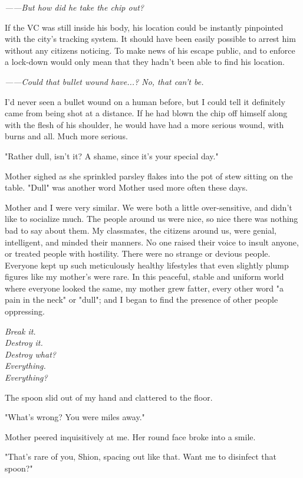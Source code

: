 \emph{------But how did he take the chip out?}

If the VC was still inside his body, his location could be instantly
pinpointed with the city's tracking system. It should have been easily
possible to arrest him without any citizens noticing. To make news of
his escape public, and to enforce a lock-down would only mean that they
hadn't been able to find his location.

\emph{------Could that bullet wound have...? No, that can't be.}

I'd never seen a bullet wound on a human before, but I could tell it
definitely came from being shot at a distance. If he had blown the chip
off himself along with the flesh of his shoulder, he would have had a
more serious wound, with burns and all. Much more serious.

"Rather dull, isn't it? A shame, since it's your special day."

Mother sighed as she sprinkled parsley flakes into the pot of stew
sitting on the table. "Dull" was another word Mother used more often
these days.

Mother and I were very similar. We were both a little over-sensitive,
and didn't like to socialize much. The people around us were nice, so
nice there was nothing bad to say about them. My classmates, the
citizens around us, were genial, intelligent, and minded their manners.
No one raised their voice to insult anyone, or treated people with
hostility. There were no strange or devious people. Everyone kept up
such meticulously healthy lifestyles that even slightly plump figures
like my mother's were rare. In this peaceful, stable and uniform world
where everyone looked the same, my mother grew fatter, every other word
"a pain in the neck" or "dull"; and I began to find the presence of
other people oppressing.

\myspace

\emph{Break it.\\
	Destroy it.\\
	Destroy what?\\
	Everything.\\
	Everything?}

\myspace

The spoon slid out of my hand and clattered to the floor.

"What's wrong? You were miles away."

Mother peered inquisitively at me. Her round face broke into a smile.

"That's rare of you, Shion, spacing out like that. Want me to disinfect
that spoon?"

